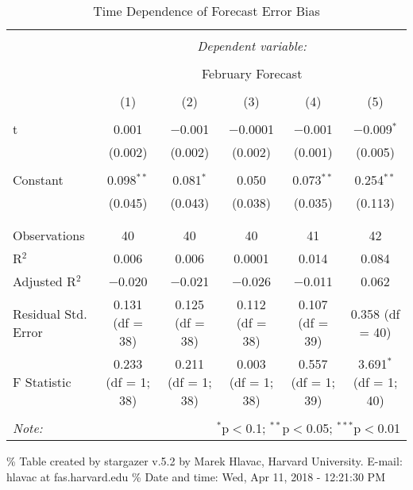 \documentclass[]{article}
\begin{document}
\begin{table}[!htbp] \centering 
  \caption{Time Dependence of Forecast Error Bias} 
  \label{} 
\begin{tabular}{@{\extracolsep{5pt}}lccccc} 
\\[-1.8ex]\hline 
\hline \\[-1.8ex] 
 & \multicolumn{5}{c}{\textit{Dependent variable:}} \\ 
\cline{2-6} 
\\[-1.8ex] & \multicolumn{5}{c}{February Forecast} \\ 
\\[-1.8ex] & (1) & (2) & (3) & (4) & (5)\\ 
\hline \\[-1.8ex] 
 t & 0.001 & $-$0.001 & $-$0.0001 & $-$0.001 & $-$0.009$^{*}$ \\ 
  & (0.002) & (0.002) & (0.002) & (0.001) & (0.005) \\ 
  & & & & & \\ 
 Constant & 0.098$^{**}$ & 0.081$^{*}$ & 0.050 & 0.073$^{**}$ & 0.254$^{**}$ \\ 
  & (0.045) & (0.043) & (0.038) & (0.035) & (0.113) \\ 
  & & & & & \\ 
\hline \\[-1.8ex] 
Observations & 40 & 40 & 40 & 41 & 42 \\ 
R$^{2}$ & 0.006 & 0.006 & 0.0001 & 0.014 & 0.084 \\ 
Adjusted R$^{2}$ & $-$0.020 & $-$0.021 & $-$0.026 & $-$0.011 & 0.062 \\ 
Residual Std. Error & 0.131 (df = 38) & 0.125 (df = 38) & 0.112 (df = 38) & 0.107 (df = 39) & 0.358 (df = 40) \\ 
F Statistic & 0.233 (df = 1; 38) & 0.211 (df = 1; 38) & 0.003 (df = 1; 38) & 0.557 (df = 1; 39) & 3.691$^{*}$ (df = 1; 40) \\ 
\hline 
\hline \\[-1.8ex] 
\textit{Note:}  & \multicolumn{5}{r}{$^{*}$p$<$0.1; $^{**}$p$<$0.05; $^{***}$p$<$0.01} \\ 
\end{tabular} 
\end{table}

\% Table created by stargazer v.5.2 by Marek Hlavac, Harvard University.
E-mail: hlavac at fas.harvard.edu \% Date and time: Wed, Apr 11, 2018 -
12:21:30 PM
\end{document}
